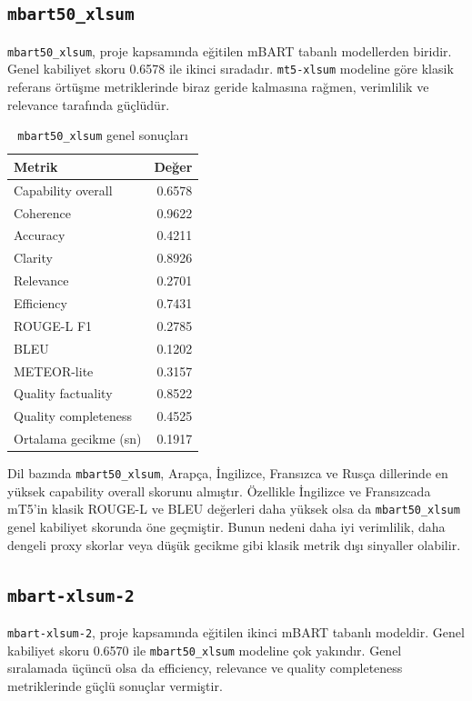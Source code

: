 \documentclass[12pt,a4paper]{article}
\begin{document}
\subsection{\texttt{mbart50\_xlsum}}

\texttt{mbart50\_xlsum}, proje kapsamında eğitilen mBART tabanlı modellerden biridir. Genel kabiliyet skoru 0.6578 ile ikinci sıradadır. \texttt{mt5-xlsum} modeline göre klasik referans örtüşme metriklerinde biraz geride kalmasına rağmen, verimlilik ve relevance tarafında güçlüdür.

\begin{table}[H]
\centering
\caption{\texttt{mbart50\_xlsum} genel sonuçları}
\begin{tabular}{lr}
\toprule
Metrik & Değer \\
\midrule
Capability overall & 0.6578 \\
Coherence & 0.9622 \\
Accuracy & 0.4211 \\
Clarity & 0.8926 \\
Relevance & 0.2701 \\
Efficiency & 0.7431 \\
ROUGE-L F1 & 0.2785 \\
BLEU & 0.1202 \\
METEOR-lite & 0.3157 \\
Quality factuality & 0.8522 \\
Quality completeness & 0.4525 \\
Ortalama gecikme (sn) & 0.1917 \\
\bottomrule
\end{tabular}
\end{table}

Dil bazında \texttt{mbart50\_xlsum}, Arapça, İngilizce, Fransızca ve Rusça dillerinde en yüksek capability overall skorunu almıştır. Özellikle İngilizce ve Fransızcada mT5'in klasik ROUGE-L ve BLEU değerleri daha yüksek olsa da \texttt{mbart50\_xlsum} genel kabiliyet skorunda öne geçmiştir. Bunun nedeni daha iyi verimlilik, daha dengeli proxy skorlar veya düşük gecikme gibi klasik metrik dışı sinyaller olabilir.

\subsection{\texttt{mbart-xlsum-2}}

\texttt{mbart-xlsum-2}, proje kapsamında eğitilen ikinci mBART tabanlı modeldir. Genel kabiliyet skoru 0.6570 ile \texttt{mbart50\_xlsum} modeline çok yakındır. Genel sıralamada üçüncü olsa da efficiency, relevance ve quality completeness metriklerinde güçlü sonuçlar vermiştir.
\end{document}
